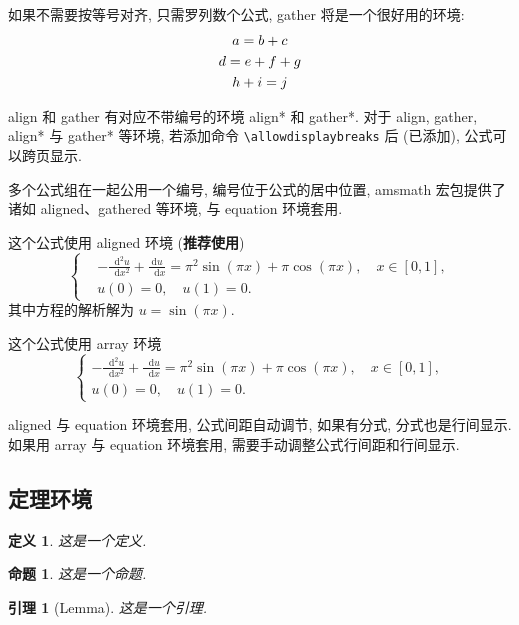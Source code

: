\documentclass[a4paper,12pt]{article}
\theoremstyle{plain}
\newtheorem{definition}{定义}[section]
\newtheorem{proposition}{命题}[section]
\newtheorem{lemma}{引理}[section]
\newcommand{\dif}{\mathop{}\!\mathrm{d}}
\begin{document}
如果不需要按等号对齐, 只需罗列数个公式, gather 将是一个很好用的环境:
\begin{gather}
a = b + c \\
d = e + f + g \notag \\
h + i = j
\end{gather}

align 和 gather 有对应不带编号的环境 align* 和 gather*.
对于 align, gather, align* 与 gather* 等环境, 若添加命令 \verb|\allowdisplaybreaks| 后 (已添加), 公式可以跨页显示.

多个公式组在一起公用一个编号, 编号位于公式的居中位置, amsmath 宏包提供了诸如 aligned、gathered 等环境, 与 equation 环境套用.

这个公式使用 aligned 环境 (\textbf{推荐使用})
\begin{equation}\label{eq:alignedEq}
\left\{\begin{aligned}
  &-\frac{{\dif}^{2} u}{\dif x^{2}}+\frac{\mathrm{d} u}{\dif x}=\pi^{2} \sin (\pi x)+\pi \cos (\pi x),\quad x \in [0,1], \\
  &u(0)=0,\quad u(1)=0.
\end{aligned} \right.
\end{equation}
其中方程的解析解为 $u=\sin(\pi x)$.

这个公式使用 array 环境
\begin{equation}\label{eq:arrayEq}
\left\{\begin{array}{l}
\displaystyle
-\frac{{\dif}^{2} u}{\dif x^{2}}+\frac{\dif u}{\dif x}=\pi^{2} \sin (\pi x)+\pi \cos (\pi x),\quad x \in [0,1], \\[6pt]
u(0)=0,\quad u(1)=0.
\end{array} \right.
\end{equation}

aligned 与 equation 环境套用, 公式间距自动调节, 如果有分式, 分式也是行间显示. 如果用 array 与 equation 环境套用, 需要手动调整公式行间距和行间显示.

\subsection{定理环境}

\begin{definition}\label{def:foo}
这是一个定义.
\end{definition}

\begin{proposition}\label{prop:foo}
这是一个命题.
\end{proposition}

\begin{lemma}[Lemma]\label{lmm:foo}
这是一个引理.
\end{lemma}
\end{document}
